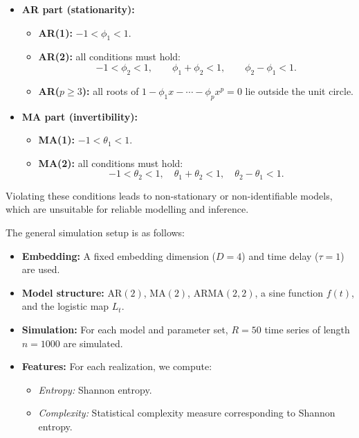 \documentclass[12pt,a4paper]{article}
\begin{document}
\begin{itemize} \item \textbf{AR part (stationarity):} 
	\begin{itemize} 
		\item \textbf{AR(1):} $-1 < \phi_1 < 1$. 
		\item \textbf{AR(2):} all conditions must hold: \[ -1 < \phi_2 < 1, \qquad \phi_1 + \phi_2 < 1, \qquad \phi_2 - \phi_1 < 1. \] 
		\item \textbf{AR($p \geq 3$):} all roots of $1 - \phi_1 x - \cdots - \phi_p x^p = 0$ lie outside the unit circle. 
	\end{itemize} 
	\item \textbf{MA part (invertibility):} 
	\begin{itemize} 
		\item \textbf{MA(1):} $-1 < \theta_1 < 1$. 
		\item \textbf{MA(2):} all conditions must hold: \[ -1 < \theta_2 < 1,\quad \theta_1 + \theta_2 < 1,\quad \theta_2 - \theta_1 < 1. \] 
	\end{itemize} 
\end{itemize}

Violating these conditions leads to non-stationary or non-identifiable models, which are unsuitable for reliable modelling and inference.

\bigskip


The general simulation setup is as follows:

\begin{itemize}
	\item \textbf{Embedding:} A fixed embedding dimension ($D = 4$) and time delay ($\tau = 1$) are used.
	\item \textbf{Model structure:} 
	$\mathrm{AR}(2)$, $\mathrm{MA}(2)$, $\mathrm{ARMA}(2,2)$, a sine function $f(t)$, and the logistic map $L_t$.
	\item \textbf{Simulation:} For each model and parameter set, $R = 50$ time series of length $n = 1000$ are simulated.
	\item \textbf{Features:} For each realization, we compute:
	\begin{itemize}
		\item \emph{Entropy:} Shannon entropy.
		\item \emph{Complexity:} Statistical complexity measure 
		corresponding to Shannon entropy.
	\end{itemize}
\end{itemize}
\end{document}
